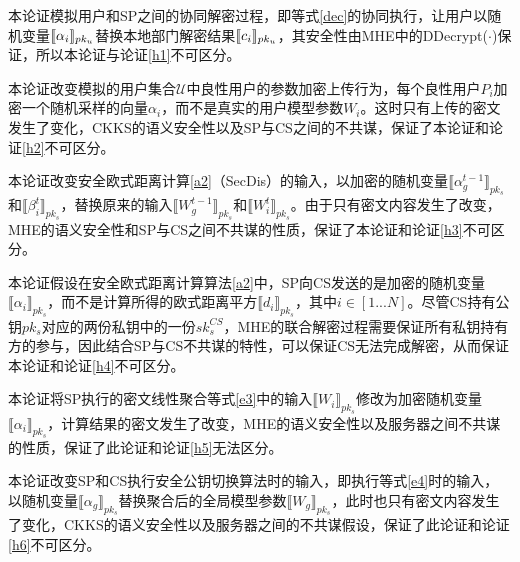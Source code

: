 \begin{hybrid}\label{h2}
	本论证模拟用户和SP之间的协同解密过程，即等式\ref{dec}的协同执行，让用户以随机变量$\ctx[pk_u]{\alpha_i}$替换本地部门解密结果$\ctx[pk_u]{c_i}$，其安全性由MHE中的DDecrypt($\cdot$)保证，所以本论证与论证\ref{h1}不可区分。
\end{hybrid}

\begin{hybrid}\label{h3}
	本论证改变模拟的用户集合$\mathcal{U}$中良性用户的参数加密上传行为，每个良性用户$P_i$加密一个随机采样的向量$\alpha_i$，而不是真实的用户模型参数$W_i$。这时只有上传的密文发生了变化，CKKS的语义安全性以及SP与CS之间的不共谋，保证了本论证和论证\ref{h2}不可区分。
\end{hybrid}

\begin{hybrid}\label{h4}
	本论证改变安全欧式距离计算\ref{a2}（SecDis）的输入，以加密的随机变量$\llbracket \alpha_{g}^{t-1}\rrbracket_{pk_s}$和$\llbracket \beta_i^{t}\rrbracket_{pk_s}$，替换原来的输入$\llbracket W_{g}^{t-1}\rrbracket_{pk_s}$和$\llbracket W_i^{t}\rrbracket_{pk_s}$。由于只有密文内容发生了改变，MHE的语义安全性和SP与CS之间不共谋的性质，保证了本论证和论证\ref{h3}不可区分。
\end{hybrid}

\begin{hybrid}\label{h5}
	本论证假设在安全欧式距离计算算法\ref{a2}中，SP向CS发送的是加密的随机变量$\llbracket \alpha_i\rrbracket_{pk_s}$，而不是计算所得的欧式距离平方$\llbracket d_i \rrbracket_{pk_s}$，其中$i \in [1...N]$。尽管CS持有公钥$pk_s$对应的两份私钥中的一份$sk_s^{CS}$，MHE的联合解密过程需要保证所有私钥持有方的参与，因此结合SP与CS不共谋的特性，可以保证CS无法完成解密，从而保证本论证和论证\ref{h4}不可区分。
\end{hybrid}

\begin{hybrid}\label{h6}
	本论证将SP执行的密文线性聚合等式\ref{e3}中的输入$\llbracket W_i\rrbracket_{pk_s}$修改为加密随机变量$\llbracket \alpha_i\rrbracket_{pk_s}$，计算结果的密文发生了改变，MHE的语义安全性以及服务器之间不共谋的性质，保证了此论证和论证\ref{h5}无法区分。
\end{hybrid}

\begin{hybrid}\label{h7}
	本论证改变SP和CS执行安全公钥切换算法时的输入，即执行等式\ref{e4}时的输入，以随机变量$\llbracket \alpha_g\rrbracket_{pk_s}$替换聚合后的全局模型参数$\llbracket W_g\rrbracket_{pk_s}$，此时也只有密文内容发生了变化，CKKS的语义安全性以及服务器之间的不共谋假设，保证了此论证和论证\ref{h6}不可区分。
\end{hybrid}

